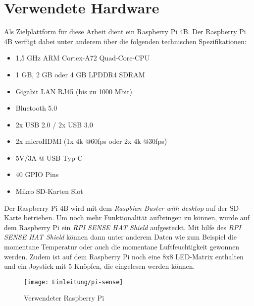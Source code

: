 \section{Verwendete Hardware}
\label{sec:verwendeteHardware}
Als Zielplattform für diese Arbeit dient ein Raspberry Pi 4B. Der Raspberry Pi 4B
verfügt dabei unter anderem über die folgenden technischen Spezifikationen: \cite{RasberryPiSpecs}
\begin{itemize}
    \item 1,5 GHz ARM Cortex-A72 Quad-Core-CPU
    \item 1 GB, 2 GB oder 4 GB LPDDR4 SDRAM
    \item Gigabit LAN RJ45 (bis zu 1000 Mbit)
    \item Bluetooth 5.0
    \item 2x USB 2.0 / 2x USB 3.0
    \item 2x microHDMI (1x 4k @60fps oder 2x 4k @30fps)
    \item 5V/3A @ USB Typ-C
    \item 40 GPIO Pins
    \item Mikro SD-Karten Slot
\end{itemize}
Der Raspberry Pi 4B wird mit dem \emph{Raspbian Buster with desktop} auf der SD-Karte betrieben.
\newline
Um noch mehr Funktionalität aufbringen zu können, wurde auf dem Raspberry Pi ein
\emph{RPI SENSE HAT Shield} aufgesteckt. Mit hilfe des \emph{RPI SENSE HAT Shield} können dann
unter anderem Daten wie zum Beispiel die momentane Temperatur oder auch die momentane
Luftfeuchtigkeit gewonnen werden. Zudem ist auf dem Raspberry Pi noch eine 8x8 LED-Matrix enthalten
und ein Joystick mit 5 Knöpfen, die eingelesen werden können.
\begin{figure}[h]
    \centering
    \texttt{[image: Einleitung/pi-sense]}
    \caption[Raspberry Pi 4 B]{Verwendeter Raspberry Pi}
    \label{img:piSense}
\end{figure}

